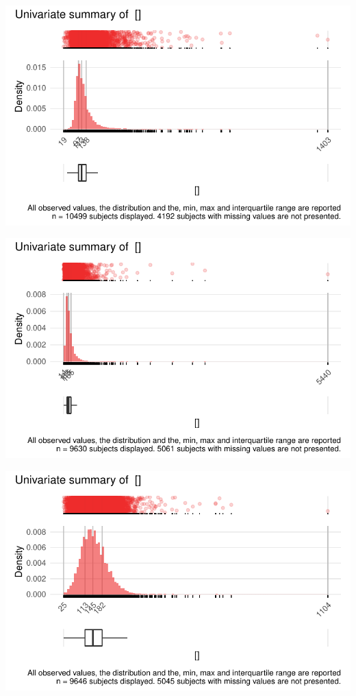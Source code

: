 \documentclass[
  letterpaper,
  DIV=11,
  numbers=noendperiod]{scrreport}
\begin{document}
\includegraphics{./Bact_univar_files/figure-pdf/uni04-29.pdf}

\includegraphics{./Bact_univar_files/figure-pdf/uni04-30.pdf}

\includegraphics{./Bact_univar_files/figure-pdf/uni04-31.pdf}
\end{document}
